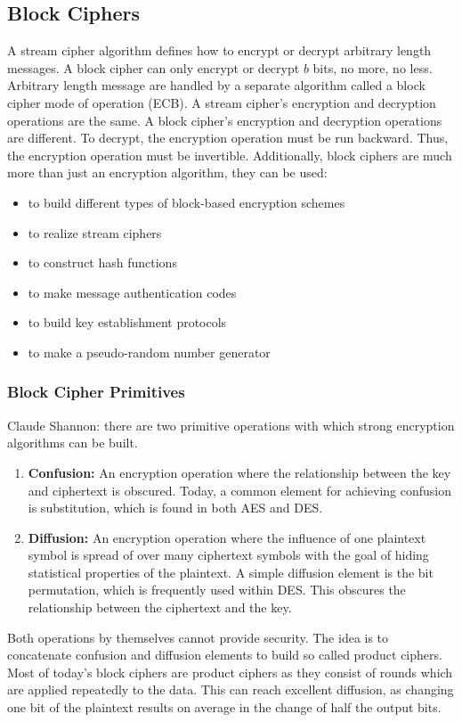 \documentclass{math}
\begin{document}
\subsection*{Block Ciphers}
A stream cipher algorithm defines how to encrypt or decrypt arbitrary length
messages. A block cipher can only encrypt or decrypt \( b \) bits, no more, no
less. Arbitrary length message are handled by a separate algorithm called a
block cipher mode of operation (ECB). A stream cipher's encryption and
decryption operations are the same. A block cipher's encryption and decryption
operations are different. To decrypt, the encryption operation must be run
backward. Thus, the encryption operation must be invertible. Additionally, block
ciphers are much more than just an encryption algorithm, they can be used:
\begin{itemize}
  \item to build different types of block-based encryption schemes
  \item to realize stream ciphers
  \item to construct hash functions
  \item to make message authentication codes
  \item to build key establishment protocols
  \item to make a pseudo-random number generator
\end{itemize}

\subsubsection*{Block Cipher Primitives}
Claude Shannon: there are two primitive operations with which strong encryption
algorithms can be built.
\begin{enumerate}
  \item \textbf{Confusion:} An encryption operation where the relationship
  between the key and ciphertext is obscured. Today, a common element for
  achieving confusion is substitution, which is found in both AES and DES.
  \item \textbf{Diffusion:} An encryption operation where the influence of one
  plaintext symbol is spread of over many ciphertext symbols with the goal of
  hiding statistical properties of the plaintext. A simple diffusion element is
  the bit permutation, which is frequently used within DES. This obscures the
  relationship between the ciphertext and the key.
\end{enumerate}
Both operations by themselves cannot provide security. The idea is to
concatenate confusion and diffusion elements to build so called product ciphers.
Most of today's block ciphers are product ciphers as they consist of rounds
which are applied repeatedly to the data. This can reach excellent diffusion, as
changing one bit of the plaintext results on average in the change of half the
output bits.
\end{document}
